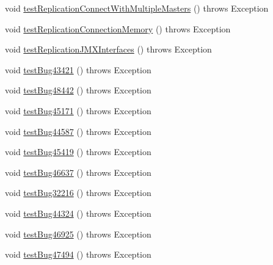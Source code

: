 \begin{DoxyCompactItemize}
void \mbox{\hyperlink{classtestsuite_1_1regression_1_1_connection_regression_test_a9fea3f0a4beda9a0b6b4e7c56c4f3e4c}{test\+Replication\+Connect\+With\+Multiple\+Masters}} ()  throws Exception 
\item 
void \mbox{\hyperlink{classtestsuite_1_1regression_1_1_connection_regression_test_ae64eeeb2734fee03249f2eb0cc84932b}{test\+Replication\+Connection\+Memory}} ()  throws Exception 
\item 
void \mbox{\hyperlink{classtestsuite_1_1regression_1_1_connection_regression_test_a7eeb8973b2b0b353461d7a11a8cef7c5}{test\+Replication\+J\+M\+X\+Interfaces}} ()  throws Exception 
\item 
void \mbox{\hyperlink{classtestsuite_1_1regression_1_1_connection_regression_test_a673b4f2230fa79238a961f2593aa77b9}{test\+Bug43421}} ()  throws Exception 
\item 
void \mbox{\hyperlink{classtestsuite_1_1regression_1_1_connection_regression_test_a826a12b4208be5e973bbdc9353295e90}{test\+Bug48442}} ()  throws Exception 
\item 
void \mbox{\hyperlink{classtestsuite_1_1regression_1_1_connection_regression_test_a0c5770f00918e8c74b7a180ae4524c3b}{test\+Bug45171}} ()  throws Exception 
\item 
void \mbox{\hyperlink{classtestsuite_1_1regression_1_1_connection_regression_test_af33f3215b2db8a83a5b3bb4079964dd3}{test\+Bug44587}} ()  throws Exception 
\item 
void \mbox{\hyperlink{classtestsuite_1_1regression_1_1_connection_regression_test_a146f354cd24064670a0dae6971fb2a77}{test\+Bug45419}} ()  throws Exception 
\item 
void \mbox{\hyperlink{classtestsuite_1_1regression_1_1_connection_regression_test_ad83cb2295a1cdeb72ae83aa59598fa13}{test\+Bug46637}} ()  throws Exception 
\item 
void \mbox{\hyperlink{classtestsuite_1_1regression_1_1_connection_regression_test_abfdd56545e86c0acf1bff8f910406c0d}{test\+Bug32216}} ()  throws Exception 
\item 
void \mbox{\hyperlink{classtestsuite_1_1regression_1_1_connection_regression_test_a5d2ab7ab17c3a8af40878f8f8000b7f7}{test\+Bug44324}} ()  throws Exception 
\item 
void \mbox{\hyperlink{classtestsuite_1_1regression_1_1_connection_regression_test_a409adc6cf0fa1ce34dc24fb13f9b5d4e}{test\+Bug46925}} ()  throws Exception 
\item 
void \mbox{\hyperlink{classtestsuite_1_1regression_1_1_connection_regression_test_ab435d027dfb687f6ee3394bfa3b0456e}{test\+Bug47494}} ()  throws Exception 

\end{DoxyCompactItemize}
